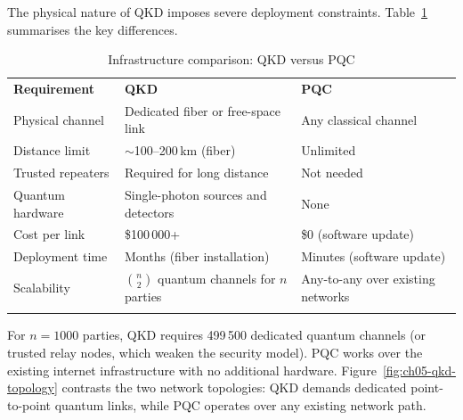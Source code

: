 The physical nature of QKD imposes severe deployment constraints.  Table~\ref{tab:qkd-pqc-infra} summarises the key differences.

\begin{table}[t]
\caption{Infrastructure comparison: QKD versus PQC}
\label{tab:qkd-pqc-infra}
\begin{tabular}{p{3cm}p{4.2cm}p{4.2cm}}
\hline\noalign{\smallskip}
\textbf{Requirement} & \textbf{QKD} & \textbf{PQC} \\
\noalign{\smallskip}\svhline\noalign{\smallskip}
Physical channel  & Dedicated fiber or free-space link & Any classical channel \\
Distance limit    & $\sim$100--200\,km (fiber)         & Unlimited \\
Trusted repeaters & Required for long distance          & Not needed \\
Quantum hardware  & Single-photon sources and detectors & None \\
Cost per link     & \$100\,000+                         & \$0 (software update) \\
Deployment time   & Months (fiber installation)          & Minutes (software update) \\
Scalability       & $\binom{n}{2}$ quantum channels for $n$ parties & Any-to-any over existing networks \\
\noalign{\smallskip}\hline
\end{tabular}
\end{table}

For $n = 1000$ parties, QKD requires 499\,500 dedicated quantum channels (or trusted relay nodes, which weaken the security model).  PQC works over the existing internet infrastructure with no additional hardware.  Figure~\ref{fig:ch05-qkd-topology} contrasts the two network topologies: QKD demands dedicated point-to-point quantum links, while PQC operates over any existing network path.

